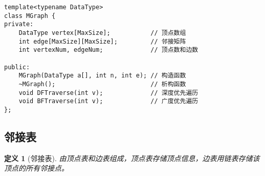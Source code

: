 \documentclass[12pt,a4paper]{amsart}
\newtheorem{definition}{定义}[section]
\begin{document}
\begin{lstlisting}[caption=邻接矩阵类定义]
template<typename DataType>
class MGraph {
private:
    DataType vertex[MaxSize];           // 顶点数组
    int edge[MaxSize][MaxSize];         // 邻接矩阵
    int vertexNum, edgeNum;             // 顶点数和边数

public:
    MGraph(DataType a[], int n, int e); // 构造函数
    ~MGraph();                          // 析构函数
    void DFTraverse(int v);             // 深度优先遍历
    void BFTraverse(int v);             // 广度优先遍历
};
\end{lstlisting}

\subsection{邻接表}

\begin{definition}[邻接表]
由顶点表和边表组成，顶点表存储顶点信息，边表用链表存储该顶点的所有邻接点。
\end{definition}
\end{document}
